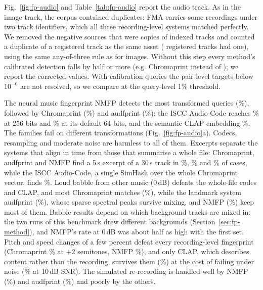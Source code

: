 Fig.~\ref{fig:fp-audio} and Table~\ref{tab:fp-audio} report the audio track. As in the image track, the corpus contained duplicates: FMA carries some recordings under two track identifiers, which all three recording-level systems matched perfectly. We removed the  negative sources that were copies of indexed tracks and counted a duplicate of a registered track as the same asset ( registered tracks had one), using the same any-of-three rule as for images. Without this step every method's calibrated detection falls by half or more (e.g. Chromaprint  instead of ); we report the corrected values. With  calibration queries the pair-level targets below $10^{-6}$ are not resolved, so we compare at the query-level 1\% threshold.

The neural music fingerprint NMFP detects the most transformed queries (\%), followed by Chromaprint (\%) and audfprint (\%); the ISCC Audio-Code reaches \% at 256 bits and \% at its default 64 bits, and the semantic CLAP embedding \%. The families fail on different transformations (Fig.~\ref{fig:fp-audio}a). Codecs, resampling and moderate noise are harmless to all of them. Excerpts separate the systems that align in time from those that summarise a whole file: Chromaprint, audfprint and NMFP find a 5\,s excerpt of a 30\,s track in \%, \% and \% of cases, while the ISCC Audio-Code, a single SimHash over the whole Chromaprint vector, finds \%. Loud babble from other music (0\,dB) defeats the whole-file codes and CLAP, and most Chromaprint matches (\%), while the landmark system audfprint (\%), whose sparse spectral peaks survive mixing, and NMFP (\%) keep most of them. Babble results depend on which background tracks are mixed in: the two runs of this benchmark drew different backgrounds (Section~\ref{sec:fp-method}), and NMFP's rate at 0\,dB was about half as high with the first set. Pitch and speed changes of a few percent defeat every recording-level fingerprint (Chromaprint \% at $+2$ semitones, NMFP \%), and only CLAP, which describes content rather than the recording, survives them (\%) at the cost of failing under noise (\% at 10\,dB SNR). The simulated re-recording is handled well by NMFP (\%) and audfprint (\%) and poorly by the others.

